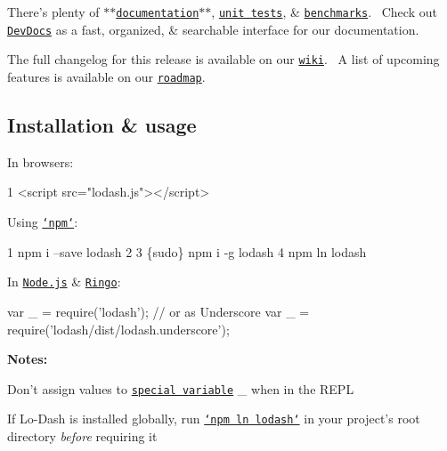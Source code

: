 There’s plenty of $\ast$$\ast$\href{https://lodash.com/docs}{\tt documentation}$\ast$$\ast$, \href{https://lodash.com/tests}{\tt unit tests}, \& \href{https://lodash.com/benchmarks}{\tt benchmarks}.~\newline
 Check out \href{http://devdocs.io/lodash/}{\tt Dev\+Docs} as a fast, organized, \& searchable interface for our documentation.

The full changelog for this release is available on our \href{https://github.com/lodash/lodash/wiki/Changelog}{\tt wiki}.~\newline
 A list of upcoming features is available on our \href{https://github.com/lodash/lodash/wiki/Roadmap}{\tt roadmap}.

\subsection*{Installation \& usage}

In browsers\+:


\begin{DoxyCode}
1 <script src="lodash.js"></script>
\end{DoxyCode}


Using \href{http://npmjs.org/}{\tt `npm`}\+:


\begin{DoxyCode}
1 npm i --save lodash
2 
3 \{sudo\} npm i -g lodash
4 npm ln lodash
\end{DoxyCode}


In \href{http://nodejs.org/}{\tt Node.\+js} \& \href{http://ringojs.org/}{\tt Ringo}\+:


\begin{DoxyCode}
var \_ = require(\textcolor{stringliteral}{'lodash'});
\textcolor{comment}{// or as Underscore}
var \_ = require(\textcolor{stringliteral}{'lodash/dist/lodash.underscore'});
\end{DoxyCode}


{\bfseries Notes\+:}
\begin{DoxyItemize}
\item Don’t assign values to \href{http://nodejs.org/api/repl.html#repl_repl_features}{\tt special variable} {\ttfamily \+\_\+} when in the R\+E\+P\+L
\item If Lo-\/\+Dash is installed globally, run \href{http://blog.nodejs.org/2011/03/23/npm-1-0-global-vs-local-installation/}{\tt `npm ln lodash`} in your project’s root directory {\itshape before} requiring it
\end{DoxyItemize}

